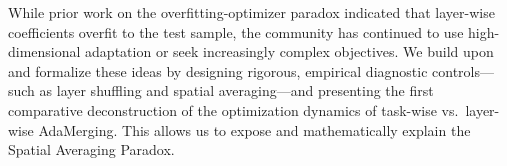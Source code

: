 While prior work on the overfitting-optimizer paradox \cite{adamerging_paradox} indicated that layer-wise coefficients overfit to the test sample, the community has continued to use high-dimensional adaptation or seek increasingly complex objectives. We build upon and formalize these ideas by designing rigorous, empirical diagnostic controls---such as layer shuffling and spatial averaging---and presenting the first comparative deconstruction of the optimization dynamics of task-wise vs.\ layer-wise AdaMerging. This allows us to expose and mathematically explain the Spatial Averaging Paradox.
